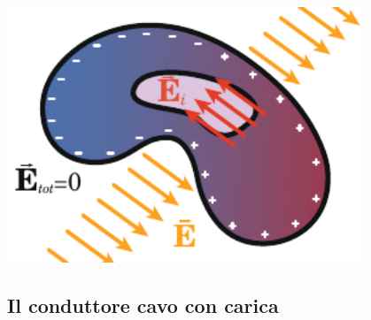 \begin{minipage}{0.43\textwidth}
\begin{center}
	\includegraphics[width=0.8\textwidth]{images/chp4/chp4condcavocampoind.pdf}
\end{center}
\end{minipage}
\subsection{Il conduttore cavo con carica}\label{conduttorecavosfericoconcarica}
